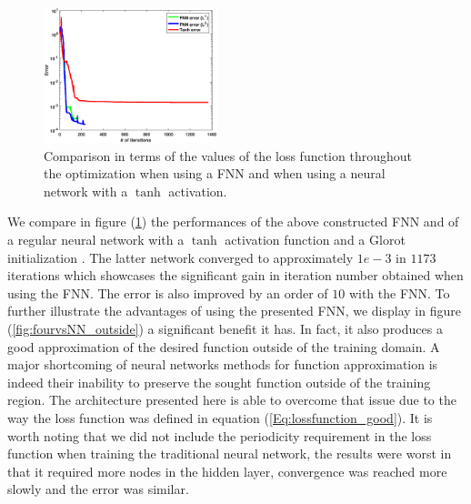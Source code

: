 \documentclass[AMS,STIX1COL]{WileyNJD-v2}
\begin{document}
 \begin{figure}[!htb]
    \centering
    \includegraphics[width=0.45\textwidth]{itertanhvsfnn.eps}
    \caption{\;Comparison in terms of the values of the loss function throughout the optimization when using a FNN and when using a neural network with a $\tanh$ activation.}
    \label{fig:fourvsNN_iter}
\end{figure}


We compare in figure (\ref{fig:fourvsNN_iter}) the performances of the above constructed FNN and of a regular neural network with a $\tanh$ activation function and a Glorot initialization \cite{Glorot2010}. The latter network converged to approximately $1e-3$ in $1173$ iterations which showcases the significant gain in iteration number obtained when using the FNN. The error is also improved by an order of $10$ with the FNN. To further illustrate the advantages of using the presented FNN, we display in figure (\ref{fig:fourvsNN_outside}) a significant benefit it has. In fact, it also produces a good approximation of the desired function outside of the training domain. A major shortcoming of neural networks methods for function approximation is indeed their inability to preserve the sought function outside of the training region. The architecture presented here is able to overcome that issue due to the way the loss function was defined in equation (\ref{Eq:lossfunction_good}). It is worth noting that we did not include the periodicity requirement in the loss function when training the traditional neural network, the results were worst in that it required more nodes in the hidden layer, convergence was reached more slowly and the error was similar.

\end{document}
